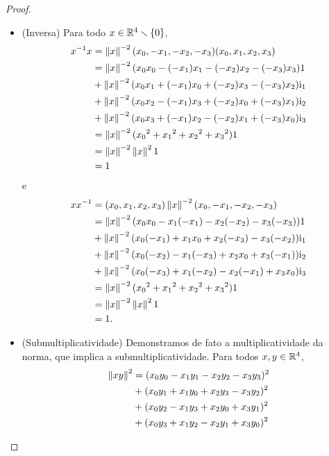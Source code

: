 \begin{proof}
\begin{itemize}
	\item (Inversa) Para todo $x \in \mathbb{R}^4 \smallsetminus \{0\}$,
		\begin{align*}
		x^{-1} x &= \left\Vert{x}\right\Vert^{-2} (x_0,-x_1,-x_2,-x_3)(x_0,x_1,x_2,x_3) \\
			&= \left\Vert{x}\right\Vert^{-2} (x_0x_0 - (-x_1)x_1 - (-x_2)x_2 - (-x_3)x_3) 1 \\
			&+ \left\Vert{x}\right\Vert^{-2} (x_0x_1 + (-x_1)x_0 + (-x_2)x_3 - (-x_3)x_2) \mathrm{i}_1 \\
			&+ \left\Vert{x}\right\Vert^{-2} (x_0x_2 - (-x_1)x_3 + (-x_2)x_0 + (-x_3)x_1) \mathrm{i}_2 \\
			&+ \left\Vert{x}\right\Vert^{-2} (x_0x_3 + (-x_1)x_2 - (-x_2)x_1 + (-x_3)x_0) \mathrm{i}_3 \\
			&= \left\Vert{x}\right\Vert^{-2} ({x_0}^2 + {x_1}^2 + {x_2}^2 + {x_3}^2) 1 \\
			&= \left\Vert{x}\right\Vert^{-2} \left\Vert{x}\right\Vert^2 1 \\
			&= 1
		\end{align*}
	e
		\begin{align*}
		x x^{-1} &= (x_0,x_1,x_2,x_3) \left\Vert{x}\right\Vert^{-2}(x_0,-x_1,-x_2,-x_3) \\
			&= \left\Vert{x}\right\Vert^{-2} (x_0x_0 - x_1(-x_1) - x_2(-x_2) - x_3(-x_3)) 1 \\
			&+ \left\Vert{x}\right\Vert^{-2} (x_0(-x_1) + x_1x_0 + x_2(-x_3) - x_3(-x_2)) \mathrm{i}_1 \\
			&+ \left\Vert{x}\right\Vert^{-2} (x_0(-x_2) - x_1(-x_3) + x_2x_0 + x_3(-x_1)) \mathrm{i}_2 \\
			&+ \left\Vert{x}\right\Vert^{-2} (x_0(-x_3) + x_1(-x_2) - x_2(-x_1) + x_3x_0) \mathrm{i}_3 \\
			&= \left\Vert{x}\right\Vert^{-2} ({x_0}^2 + {x_1}^2 + {x_2}^2 + {x_3}^2) 1 \\
			&= \left\Vert{x}\right\Vert^{-2} \left\Vert{x}\right\Vert^2 1 \\
			&= 1.
		\end{align*}
\end{itemize}
\begin{itemize}
	\item (Submultiplicatividade) Demonstramos de fato a multiplicatividade da norma, que implica a submultiplicatividade. Para todos $x,y \in \mathbb{R}^4$,
		\begin{align*}
		\nor{xy}^2 &= (x_0y_0 - x_1y_1 - x_2y_2 - x_3y_3)^2 \\
			&+ (x_0y_1 + x_1y_0 + x_2y_3 - x_3y_2)^2 \\
			&+ (x_0y_2 - x_1y_3 + x_2y_0 + x_3y_1)^2 \\
			&+ (x_0y_3 + x_1y_2 - x_2y_1 + x_3y_0)^2 \\

\end{align*}
\end{itemize}
\end{proof}
